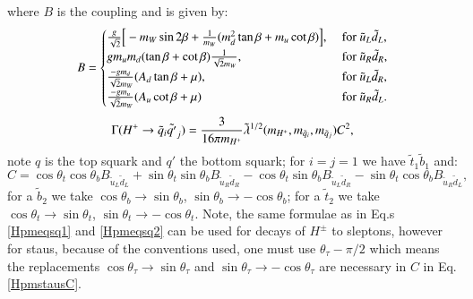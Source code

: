 \documentclass[final,3p,times]{elsarticle}
\begin{document}
where $B$ is the coupling and is given by:
\begin{equation}
B = \begin{cases}
		{g \over \sqrt{2}}\Big[-m_W \sin2\beta + {1 \over m_W}(m_{d}^2 \tan \beta + m_{u}\cot\beta)\Big], &$  for $  \tilde{u}_L \tilde{d}_L, \\
		gm_u m_d (\tan\beta + \cot\beta){1 \over \sqrt{2} m_W}, &$  for $ \tilde{u}_R \tilde{d}_R, \\
		{-g m_d \over \sqrt{2} m_W}(A_d \tan\beta + \mu), &$  for $ \tilde{u}_L \tilde{d}_R, \\
		{-gm_u \over \sqrt{2}m_W}(A_u \cot \beta + \mu) &$  for $ \tilde{u}_R \tilde{d}_L. \\
		\end{cases}
\end{equation}
\begin{equation} \label{Hpmeqsq2}
\Gamma(H^+ \rightarrow \tilde{q}_i \tilde{q'}_j) = {3 \over 16 \pi m_{H^+}} \tilde{\lambda}^{1/2}(m_{H^+},m_{\tilde{q}_i}, m_{\tilde{q}_j}) C^2,
\end{equation} 
note $q$ is the top squark and $q'$ the bottom squark; for $i=j=1$ we have $\tilde{t}_1 \tilde{b}_1$ and:
\begin{equation} \label{HpmstausC}
C = \cos\theta_t \cos\theta_b B_{\tilde{u}_L \tilde{d}_L} + \sin\theta_t \sin\theta_b B_{\tilde{u}_R \tilde{d}_R} - \cos\theta_t \sin\theta_b B_{\tilde{u}_L \tilde{d}_R} - \sin\theta_t \cos\theta_b B_{\tilde{u}_R \tilde{d}_L},
\end{equation}
for a $\tilde{b}_2$ we take $ \cos\theta_b \rightarrow \sin \theta_b$, $\sin\theta_b \rightarrow -\cos\theta_b$;
for a $\tilde{t}_2$ we take $ \cos\theta_t \rightarrow \sin \theta_t$, $\sin\theta_t \rightarrow -\cos\theta_t$.
Note, the same formulae as in Eq.s \eqref{Hpmeqsq1} and \eqref{Hpmeqsq2} can be used for decays of $H^{\pm}$ to sleptons, however for staus, because of the conventions used, one must use $\theta_{\tau} - \pi/2$ which means the replacements  $\cos\theta_{\tau} \rightarrow \sin\theta_{\tau}$ and $\sin\theta_{\tau} \rightarrow -\cos\theta_{\tau}$ are necessary in $C$ in Eq. \eqref{HpmstausC}.
\end{document}
